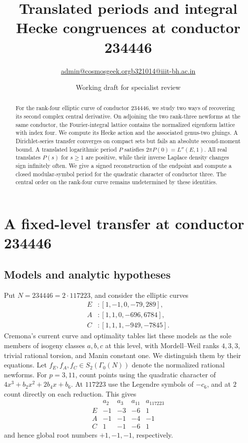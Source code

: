 \documentclass[11pt]{article}
\title{Translated periods and integral Hecke congruences at conductor 234446}
\author{\small \href{mailto:admin@cosmosgeek.org}{admin@cosmosgeek.org}\qquad \href{mailto:b321014@iiit-bh.ac.in}{b321014@iiit-bh.ac.in}}
\date{Working draft for specialist review}
\begin{document}
\maketitle
\begin{abstract}
For the rank-four elliptic curve of conductor 234446, we study two
ways of recovering its second complex central derivative. On adjoining
the two rank-three newforms at the same conductor, the Fourier-integral
lattice contains the normalized eigenform lattice with index four. We
compute its Hecke action and the associated genus-two gluings. A
Dirichlet-series transfer converges on compact sets but fails an
absolute second-moment bound.
A translated logarithmic period \(P\) satisfies \(2\pi P(0)=L''(E,1)\).
All real translates \(P(s)\) for \(s\ge1\) are positive, while their
inverse Laplace density changes sign infinitely often. We give a signed
reconstruction of the endpoint and compute a closed modular-symbol
period for the quadratic character of conductor three. The central order
on the rank-four curve remains undetermined by these identities.
\end{abstract}

\section{A fixed-level transfer at conductor 234446}
\label{sec:234446-transfer}

\subsection{Models and analytic hypotheses}

Put \(N=234446=2\cdot117223\), and consider the elliptic curves
\[
\begin{aligned}
E &: [1,-1,0,-79,289],\\
A &: [1,1,0,-696,6784],\\
C &: [1,1,1,-949,-7845].
\end{aligned}
\]
Cremona's current curve and optimality tables \cite{Cremona} list these
models as the sole members of isogeny classes \(a,b,c\) at this level,
with Mordell--Weil ranks \(4,3,3\), trivial rational torsion, and Manin
constant one. We distinguish them by their equations.
Let \(f_E,f_A,f_C\in S_2(\Gamma_0(N))\) denote the normalized
rational newforms. For \(p=3,11\), count points using the quadratic character of
\(4x^3+b_2x^2+2b_4x+b_6\). At \(117223\) use the Legendre symbols of
\(-c_6\), and at \(2\) count directly on each reduction. This gives
\[
\begin{array}{c|rrrr}
 &a_2&a_3&a_{11}&a_{117223}\\ \hline
E&-1&-3&-6& 1\\
A&-1&-1&-4&-1\\
C& 1&-1&-6& 1
\end{array}
\]
and hence global root numbers \(+1,-1,-1\), respectively.
\end{document}
